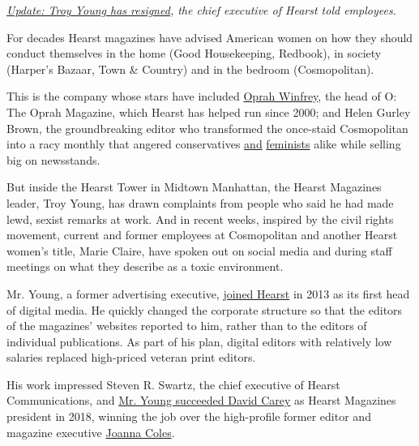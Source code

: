 \href{https://www.nytimes3xbfgragh.onion/2020/07/23/business/troy-young-hearst-magazines.html}{\emph{Update:
Troy Young has resigned}}\emph{, the chief executive of Hearst told
employees.}

For decades Hearst magazines have advised American women on how they
should conduct themselves in the home (Good Housekeeping, Redbook), in
society (Harper's Bazaar, Town \& Country) and in the bedroom
(Cosmopolitan).

This is the company whose stars have included
\href{https://www.nytimes3xbfgragh.onion/2000/04/03/business/winfrey-breaks-new-ground-with-magazine.html}{Oprah
Winfrey}, the head of O: The Oprah Magazine, which Hearst has helped run
since 2000; and Helen Gurley Brown, the groundbreaking editor who
transformed the once-staid Cosmopolitan into a racy monthly that angered
conservatives
\href{https://www.newyorker.com/books/page-turner/owning-your-desire-remembering-helen-gurley-brown}{and}
\href{https://www.nytimes3xbfgragh.onion/1974/08/11/archives/two-faces-of-ms-versus-cosmo.html}{feminists}
alike while selling big on newsstands.

But inside the Hearst Tower in Midtown Manhattan, the Hearst Magazines
leader, Troy Young, has drawn complaints from people who said he had
made lewd, sexist remarks at work. And in recent weeks, inspired by the
civil rights movement, current and former employees at Cosmopolitan and
another Hearst women's title, Marie Claire, have spoken out on social
media and during staff meetings on what they describe as a toxic
environment.

Mr. Young, a former advertising executive,
\href{https://www.nytimes3xbfgragh.onion/2013/05/09/business/media/hearst-magazines-hires-troy-young-as-digital-media-chief.html}{joined
Hearst} in 2013 as its first head of digital media. He quickly changed
the corporate structure so that the editors of the magazines' websites
reported to him, rather than to the editors of individual publications.
As part of his plan, digital editors with relatively low salaries
replaced high-priced veteran print editors.

His work impressed Steven R. Swartz, the chief executive of Hearst
Communications, and
\href{https://www.nytimes3xbfgragh.onion/2018/07/25/business/hearst-magazines-president.html}{Mr.
Young succeeded David Carey} as Hearst Magazines president in 2018,
winning the job over the high-profile former editor and magazine
executive
\href{https://www.nytimes3xbfgragh.onion/2018/08/06/business/media/joanna-coles-troy-young-hearst.html}{Joanna
Coles}.

